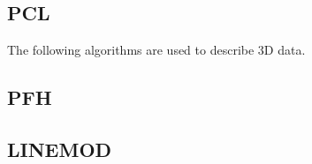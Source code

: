 \subsection{PCL}
\label{pcl}

		
The following algorithms are used to describe 3D data. 
		\subsection{PFH}
		\label{pfh}
		
		\subsection{LINEMOD}
